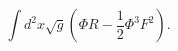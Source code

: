 \begin{equation*}
\int d^{2}x\sqrt{g}\left( \Phi R-\frac{1}{2}\Phi ^{3}F^{2}\right) .
\end{equation*}

